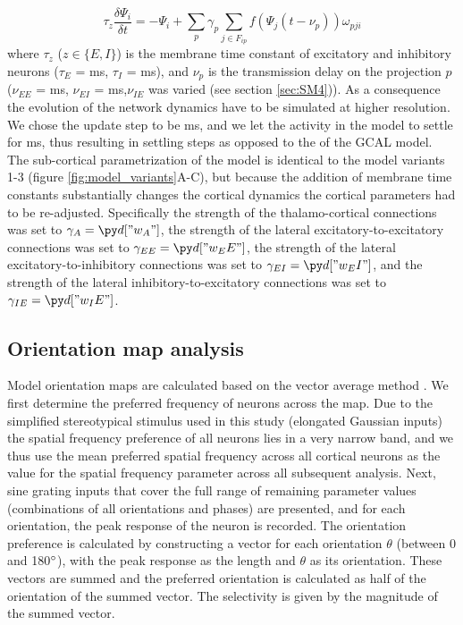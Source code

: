 \documentclass[utf8]{frontiersSCNS}
\begin{document}
\begin{equation}
\tau_{z} \frac{\delta\Psi_{i}}{\delta t} = - \Psi_{i} + \sum_{p}\gamma_{p}\sum_{j\in F_{ip}}f(\Psi_{j}(t-\nu_{p}))\omega_{pji} 
\end{equation}
\noindent where $\tau_{z}$ ($z \in \{E,I\}$) is the membrane time constant of excitatory and inhibitory neurons 
($\tau_{E}$ =  ms, $\tau_{I}$ =  ms), and $\nu_{p}$ is the transmission delay 
on the projection $p$ ($\nu_{EE}$ = ms, $\nu_{EI}$ =  ms,$\nu_{IE}$ was varied (see section \ref{sec:SM4})).
As a consequence the evolution of the network dynamics have to be simulated at higher resolution. We chose the update step to be ms, and we let the activity in the model to settle for ms, thus resulting in  settling steps as opposed to the  of the GCAL model. The sub-cortical parametrization of the model is identical to the model variants 1-3 (figure \ref{fig:model_variants}A-C), but because the addition of membrane time constants substantially changes the cortical dynamics
the cortical parameters had to be re-adjusted. Specifically the strength of the thalamo-cortical connections was set to $\gamma_{A}=\insval{w_A}$,
the strength of the lateral excitatory-to-excitatory connections was set to $\gamma_{EE}=\insval{w_EE}$, the strength of the lateral excitatory-to-inhibitory connections was set to $\gamma_{EI}=\insval{w_EI}$, and the strength of the lateral inhibitory-to-excitatory connections was set to $\gamma_{IE}=\insval{w_IE}$.

\subsection{Orientation map analysis}

Model orientation maps are calculated based on the vector average method \citep{CMVC}. We first determine the preferred frequency of neurons 
across the map. Due to the simplified stereotypical stimulus used in this study (elongated Gaussian inputs) the spatial frequency 
preference of all neurons lies in a very narrow band, and we thus use the mean preferred spatial frequency across all cortical neurons as the
value for the spatial frequency parameter across all subsequent analysis. Next, sine grating inputs that cover the full range of remaining parameter values (combinations of all orientations and phases) are presented, and for each orientation, the peak response of the neuron is recorded. The orientation preference is calculated by constructing a vector for each orientation $\theta$ (between 0 and 180$\degree$), with the peak response as
the length and $\theta$ as its orientation. These vectors are summed and the preferred orientation is calculated as half of the orientation of the summed vector. The selectivity is given by the magnitude of the summed vector. 
\end{document}
